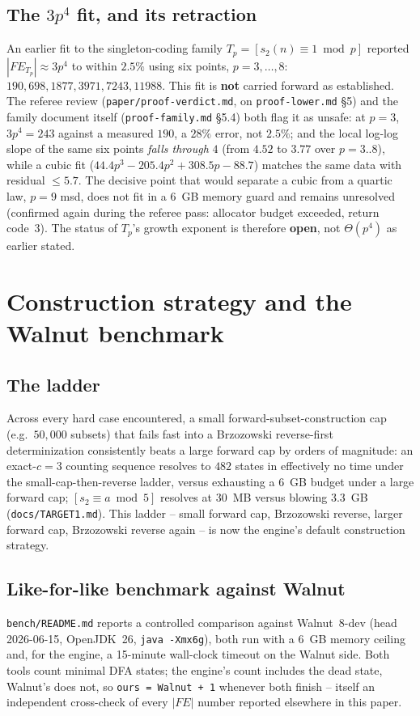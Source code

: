 \documentclass[11pt]{article}
\begin{document}
\subsection{The $3p^4$ fit, and its retraction}

An earlier fit to the singleton-coding family $T_p=[s_2(n)\equiv1\bmod p]$ reported
$|FE_{T_p}|\approx 3p^4$ to within $2.5\%$ using six points, $p=3,\ldots,8$: $190, 698,
1877, 3971, 7243, 11988$. This fit is \textbf{not} carried forward as established. The
referee review (\texttt{paper/proof-verdict.md}, on \texttt{proof-lower.md} \S5) and the
family document itself (\texttt{proof-family.md} \S5.4) both flag it as unsafe: at
$p=3$, $3p^4=243$ against a measured $190$, a $28\%$ error, not $2.5\%$; and the local
log-log slope of the same six points \emph{falls through} $4$ (from $4.52$ to $3.77$
over $p=3..8$), while a cubic fit ($44.4p^3-205.4p^2+308.5p-88.7$) matches the same data
with residual $\le5.7$. The decisive point that would separate a cubic from a quartic
law, $p=9$ msd, does not fit in a $6$~GB memory guard and remains unresolved (confirmed
again during the referee pass: allocator budget exceeded, return code~3). The status of
$T_p$'s growth exponent is therefore \textbf{open}, not $\Theta(p^4)$ as earlier stated.

\section{Construction strategy and the Walnut benchmark}
\label{sec:construction}

\subsection{The ladder}
Across every hard case encountered, a small forward-subset-construction cap (e.g.\
$50{,}000$ subsets) that fails fast into a Brzozowski reverse-first determinization
consistently beats a large forward cap by orders of magnitude: an exact-$c=3$ counting
sequence resolves to $482$ states in effectively no time under the small-cap-then-reverse
ladder, versus exhausting a $6$~GB budget under a large forward cap; $[s_2\equiv a
\bmod 5]$ resolves at $30$~MB versus blowing $3.3$~GB (\texttt{docs/TARGET1.md}). This
ladder -- small forward cap, Brzozowski reverse, larger forward cap, Brzozowski reverse
again -- is now the engine's default construction strategy.

\subsection{Like-for-like benchmark against Walnut}
\texttt{bench/README.md} reports a controlled comparison against Walnut~8-dev (head
2026-06-15, OpenJDK~26, \texttt{java -Xmx6g}), both run with a 6~GB memory ceiling and,
for the engine, a 15-minute wall-clock timeout on the Walnut side. Both tools count
minimal DFA states; the engine's count includes the dead state, Walnut's does not, so
\texttt{ours = Walnut + 1} whenever both finish -- itself an independent cross-check of
every $|FE|$ number reported elsewhere in this paper.
\end{document}
